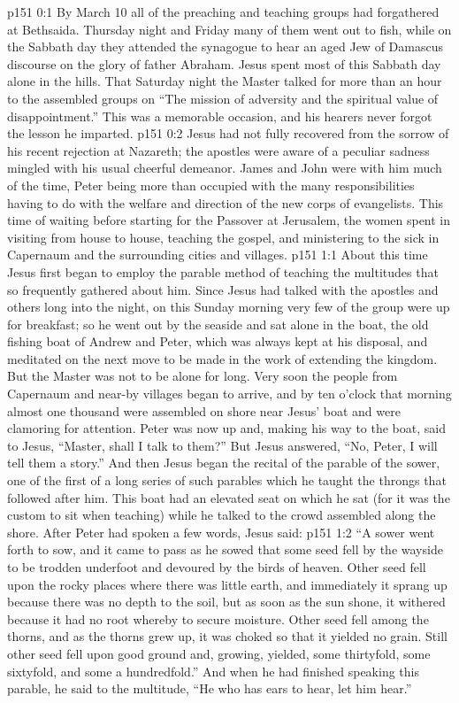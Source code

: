 \author{Midwayer Commission}
\vs p151 0:1 By March 10 all of the preaching and teaching groups had forgathered at Bethsaida. Thursday night and Friday many of them went out to fish, while on the Sabbath day they attended the synagogue to hear an aged Jew of Damascus discourse on the glory of father Abraham. Jesus spent most of this Sabbath day alone in the hills. That Saturday night the Master talked for more than an hour to the assembled groups on “The mission of adversity and the spiritual value of disappointment.” This was a memorable occasion, and his hearers never forgot the lesson he imparted.\plusone
\vs p151 0:2 Jesus had not fully recovered from the sorrow of his recent rejection at Nazareth; the apostles were aware of a peculiar sadness mingled with his usual cheerful demeanor. James and John were with him much of the time, Peter being more than occupied with the many responsibilities having to do with the welfare and direction of the new corps of evangelists. This time of waiting before starting for the Passover at Jerusalem, the women spent in visiting from house to house, teaching the gospel, and ministering to the sick in Capernaum and the surrounding cities and villages.
\vs p151 1:1 About this time Jesus first began to employ the parable method of teaching the multitudes that so frequently gathered about him. Since Jesus had talked with the apostles and others long into the night, on this Sunday morning very few of the group were up for breakfast; so he went out by the seaside and sat alone in the boat, the old fishing boat of Andrew and Peter, which was always kept at his disposal, and meditated on the next move to be made in the work of extending the kingdom. But the Master was not to be alone for long. Very soon the people from Capernaum and near\hyp{}by villages began to arrive, and by ten o’clock that morning almost one thousand were assembled on shore near Jesus’ boat and were clamoring for attention. Peter was now up and, making his way to the boat, said to Jesus, “Master, shall I talk to them?” But Jesus answered, “No, Peter, I will tell them a story.” And then Jesus began the recital of the parable of the sower, one of the first of a long series of such parables which he taught the throngs that followed after him. This boat had an elevated seat on which he sat (for it was the custom to sit when teaching) while he talked to the crowd assembled along the shore. After Peter had spoken a few words, Jesus said:
\pc \vs p151 1:2 \textcolor{ubdarkred}{“A sower went forth to sow, and it came to pass as he sowed that some seed fell by the wayside to be trodden underfoot and devoured by the birds of heaven. Other seed fell upon the rocky places where there was little earth, and immediately it sprang up because there was no depth to the soil, but as soon as the sun shone, it withered because it had no root whereby to secure moisture. Other seed fell among the thorns, and as the thorns grew up, it was choked so that it yielded no grain. Still other seed fell upon good ground and, growing, yielded, some thirtyfold, some sixtyfold, and some a hundredfold.” And when he had finished speaking this parable, he said to the multitude, “He who has ears to hear, let him hear.”}
